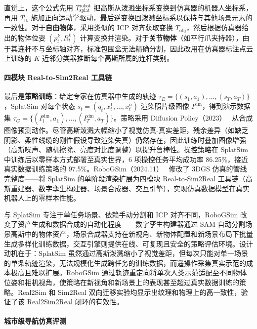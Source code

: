 直觉上，这个公式先用 $T_\text{splat}^\text{robot}$ 把高斯从泼溅坐标系变换到仿真器的机器人坐标系，再用 $T_\text{fk}^l$ 施加正向运动学驱动，最后逆变换回泼溅坐标系以保持与其他场景元素的一致性。对于\textbf{自由物体}，采用类似的 ICP 对齐获取变换 $T_{\text{obj}}$，然后根据仿真器给出的物体位姿 $(p_t^k, R_t^k)$ 计算变换并渲染。对于\textbf{关节物体}（如平行爪夹持器），由于其连杆不与坐标轴对齐，标准包围盒无法精确分割，因此改用在仿真器标注点云上训练的 $K$ 近邻分类器推断每个高斯所属的连杆类别。

\paragraph{四模块 Real-to-Sim2Real 工具链}

最后是\textbf{策略训练}：给定专家在仿真器中生成的轨迹 $\tau_E = \{(s_1, a_1), \ldots, (s_T, a_T)\}$，SplatSim 对每个状态 $s_t = (q_t, x_t^1, \ldots, x_t^n)$ 渲染照片级图像 $I^\text{sim}$，得到演示数据集 $\tau_G = \{(I_1^\text{sim}, a_1), \ldots, (I_T^\text{sim}, a_T)\}$。策略采用 Diffusion Policy（2023）~\cite{chi2023diffusion} 从合成图像预测动作。尽管高斯泼溅大幅缩小了视觉仿真-真实差距，残余差异（如缺乏阴影、柔性线缆的刚性假设导致渲染失真）仍然存在，因此训练时叠加图像增强（高斯噪声、随机擦除、亮度对比度调整）以提升鲁棒性。操控策略在 SplatSim 中训练后以零样本方式部署至真实世界，6 项操控任务平均成功率 86.25\%，接近真实数据训练策略的 97.5\%。RoboGSim（2024.11）~\cite{2411_11839} 修改了 3DGS 仿真的管线完整度——将 SplatSim 的单阶段渲染扩展为四模块 Real-to-Sim2Real 工具链（高斯重建器、数字孪生构建器、场景合成器、交互引擎），实现仿真数据模型在真实机器人上的零样本性能。

与 SplatSim 专注于单任务场景、依赖手动分割和 ICP 对齐不同，RoboGSim 改变了资产生成和数据合成的自动化程度——数字孪生构建器通过 SAM 自动分割场景高斯中的物体资产，场景合成器支持在新视角、新物体配置和新场景布局下批量生成多样化训练数据，交互引擎则提供在线、可复现且安全的策略评估环境。设计动机在于：SplatSim 虽然通过高斯泼溅缩小了视觉差距，但每次只能对单一场景的单条轨迹渲染，无法规模化生成跨任务的训练数据，而遥操作采集真实示范的成本极高且难以扩展。RoboGSim 通过轨迹重定向将单次人类示范适配至不同物体位姿和相机视角，使策略在新视角和新场景上的表现甚至超过真实数据训练的策略。Real2Sim 和 Sim2Real 双向迁移实验均显示出纹理和物理上的高一致性，验证了该 Real2Sim2Real 闭环的有效性。

\paragraph{城市级导航仿真评测}

